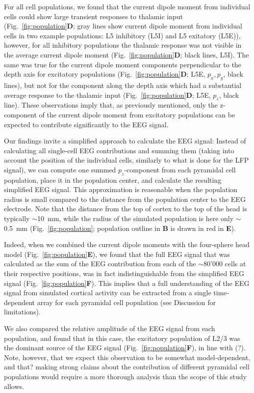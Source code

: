 \documentclass[preprint,10pt,authoryear]{elsarticle}
\newcommand{\hlg}[2][Emerald]{ {\sethlcolor{#1} \hl{#2}} }
\newcommand{\sntxt}[1]{{\color{NavyBlue}#1}}
\newcommand{\tvnnote}[1]{\color{white}{\hlg{TVN: #1 }}\color{black}}
\begin{document}
For all cell populations, we found that the current dipole moment from individual cells could show large transient responses to thalamic input (Fig.~\ref{fig:population}\textbf{D}; gray lines show current dipole moment from individual cells in two example populations: L5 inhibitory (L5I) and L5 exitatory (L5E)), however, for all inhibitory populations the thalamic response was not visible in the average current dipole moment (Fig.~\ref{fig:population}\textbf{D}; black lines, L5I). The same was true for the current dipole moment components perpendicular to the depth axis for excitatory populations (Fig.~\ref{fig:population}\textbf{D}; L5E, $p_x, p_y$, black lines), but not for the component along the depth axis which had a substantial average response to the thalamic input (Fig.~\ref{fig:population}\textbf{D}; L5E, $p_z$, black line). 
These observations imply that, as previously mentioned, only the z-component of the current dipole moment from excitatory populations can be expected to contribute significantly to the EEG signal.

Our findings invite a simplified approach to calculate the EEG signal: Instead of calculating all single-cell EEG contributions and summing them (taking into account the position of the individual cells, similarly to what is done for the LFP signal), we can compute one summed $p_z$-component from each pyramidal cell population, place it in the population center, and calculate the resulting simplified EEG signal. This approximation is reasonable when the population radius is small compared to the distance from the population center to the EEG electrode. Note that the distance from the top of cortex to the top of the head is typically $\sim$10~mm, while the radius of the simulated population is here only $\sim$0.5~mm (Fig.~\ref{fig:population}; population outline in \textbf{B} is drawn in red in \textbf{E}).

Indeed, when we combined the current dipole moments with the four-sphere head model (Fig.~\ref{fig:population}\textbf{E}), we found that the full EEG signal that was calculated as the sum of the EEG contribution from each of the $\sim$80'000 cells at their respective positions, was in fact indistinguishable from the simplified EEG signal (Fig.~\ref{fig:population}\textbf{F}). This implies that a full understanding of the EEG signal from simulated cortical activity can be extracted from a single time-dependent array for each pyramidal cell population (see Discussion for limitations).

We also compared the relative amplitude of the EEG signal from each population, and found that in this case, the excitatory population of L2/3 was the dominant source of the EEG signal (Fig.~\ref{fig:population}\textbf{F}), in line with (?)\tvnnote{(cite!)}. Note, however, that we expect this observation to be somewhat model-dependent, and \sntxt{that?} making strong claims about the contribution of different pyramidal cell populations would require a more thorough analysis than the scope of this study allows.
\end{document}
